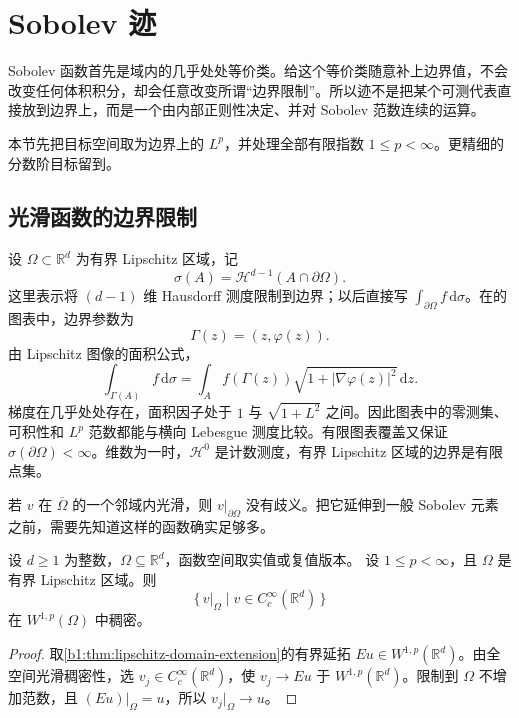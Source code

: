 \section{Sobolev 迹}
\label{b1:sec:2301}

Sobolev 函数首先是域内的几乎处处等价类。给这个等价类随意补上边界值，不会改变任何体积积分，却会任意改变所谓“边界限制”。所以迹不是把某个可测代表直接放到边界上，而是一个由内部正则性决定、并对 Sobolev 范数连续的运算。

\ProseParagraphBreak

本节先把目标空间取为边界上的 \(L^p\)，并处理全部有限指数 \(1\le p<\infty\)。更精细的分数阶目标留到。

\subsection{光滑函数的边界限制}
\label{b1:subsec:230101}

设 \(\Omega\subset\mathbb R^d\) 为有界 Lipschitz 区域，记
\[
 \sigma(A)=\mathcal H^{d-1}(A\cap\partial\Omega).
\]
这里表示将 \((d-1)\) 维 Hausdorff 测度限制到边界；以后直接写 \(\int_{\partial\Omega}f\,\mathrm d\sigma\)。在的图表中，边界参数为
\[
 \Gamma(z)=(z,\varphi(z)).
\]
由 Lipschitz 图像的面积公式，
\begin{equation}\label{b1:eq:lipschitz-boundary-measure}
 \int_{\Gamma(A)}f\,\mathrm d\sigma
 =\int_A f(\Gamma(z))\sqrt{1+|\nabla\varphi(z)|^2}\,\mathrm dz.
\end{equation}
梯度在几乎处处存在，面积因子处于 \(1\) 与 \(\sqrt{1+L^2}\) 之间。因此图表中的零测集、可积性和 \(L^p\) 范数都能与横向 Lebesgue 测度比较。有限图表覆盖又保证 \(\sigma(\partial\Omega)<\infty\)。维数为一时，\(\mathcal H^0\) 是计数测度，有界 Lipschitz 区域的边界是有限点集。

\ProseParagraphBreak

若 \(v\) 在 \(\overline\Omega\) 的一个邻域内光滑，则 \(v|_{\partial\Omega}\) 没有歧义。把它延伸到一般 Sobolev 元素之前，需要先知道这样的函数确实足够多。

\begin{proposition}\label{b1:prop:sobolev-smooth-up-to-boundary}
设 \(d\geq1\) 为整数，\(\Omega\subseteq\mathbb R^d\)，函数空间取实值或复值版本。
设 \(1\le p<\infty\)，且 \(\Omega\) 是有界 Lipschitz 区域。则
\[
 \{\,v|_\Omega\mid v\in C_c^\infty(\mathbb R^d)\,\}
\]
在 \(W^{1,p}(\Omega)\) 中稠密。
\end{proposition}
\begin{proof}
取\cref{b1:thm:lipschitz-domain-extension}的有界延拓 \(Eu\in W^{1,p}(\mathbb R^d)\)。由全空间光滑稠密性，选 \(v_j\in C_c^\infty(\mathbb R^d)\)，使 \(v_j\to Eu\) 于 \(W^{1,p}(\mathbb R^d)\)。限制到 \(\Omega\) 不增加范数，且 \((Eu)|_\Omega=u\)，所以 \(v_j|_\Omega\to u\)。
\end{proof}

